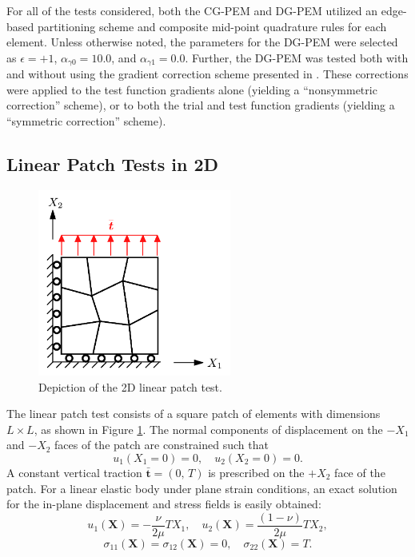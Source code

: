 For all of the tests considered, both the CG-PEM and DG-PEM utilized an edge-based partitioning scheme and composite mid-point quadrature rules for each element. Unless otherwise noted, the parameters for the DG-PEM were selected as $\epsilon = +1$, $\alpha_{\gamma0} = 10.0$, and $\alpha_{\gamma1} = 0.0$. Further, the DG-PEM was tested both with and without using the gradient correction scheme presented in \cite{Talischi:15}. These corrections were applied to the test function gradients alone (yielding a ``nonsymmetric correction'' scheme), or to both the trial and test function gradients (yielding a ``symmetric correction'' scheme).

\subsection*{Linear Patch Tests in 2D}

\begin{figure}[!h]
    \centering
    \includegraphics[width=2.5in]{figures/linear_patch_test.pdf}
    	\caption{Depiction of the 2D linear patch test.}
    \label{fig:linear_patch_test}
\end{figure}

The linear patch test consists of a square patch of elements with dimensions $L \times L$, as shown in Figure \ref{fig:linear_patch_test}. The normal components of displacement on the $-X_1$ and $-X_2$ faces of the patch are constrained such that
\begin{equation}
	u_1 (X_1 = 0) = 0, \quad u_2 (X_2 = 0) = 0.
\end{equation}
A constant vertical traction $\bar{\bm{t}} = (0, \, T)$ is prescribed on the $+X_2$ face of the patch. For a linear elastic body under plane strain conditions, an exact solution for the in-plane displacement and stress fields is easily obtained:
\begin{equation}
	u_1 (\bm{X}) = - \frac{\nu}{2 \mu} T X_1, \quad u_2 (\bm{X}) = \frac{(1-\nu)}{2 \mu} T X_2,
\end{equation}
\begin{equation}
	\sigma_{11} (\bm{X}) = \sigma_{12} (\bm{X}) = 0, \quad \sigma_{22} (\bm{X}) = T.
\end{equation}

